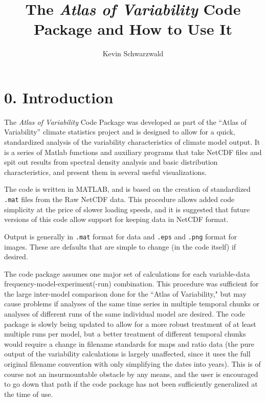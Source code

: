 \documentclass{article}
\title{The \textit{Atlas of Variability} Code Package and How to Use It}
\author{Kevin Schwarzwald}
\begin{document}
\maketitle

\tableofcontents

\section*{0. Introduction}
The \textit{Atlas of Variability} Code Package was developed as part of the ``Atlas of Variability'' climate statistics project and is designed to allow for a quick, standardized analysis of the variability characteristics of climate model output. It is a series of Matlab functions and auxiliary programs that take NetCDF files and spit out results from spectral density analysis and basic distribution characteristics, and present them in several useful visualizations. 

The code is written in MATLAB, and is based on the creation of standardized \texttt{.mat} files from the Raw NetCDF data. This procedure allows added code simplicity at the price of slower loading speeds, and it is suggested that future versions of this code allow support for keeping data in NetCDF format. 

Output is generally in \texttt{.mat} format for data and \texttt{.eps} and \texttt{.png} format for images. These are defaults that are simple to change (in the code itself) if desired.

The code package assumes one major set of calculations for each variable-data frequency-model-experiment(-run) combination. This procedure was sufficient for the large inter-model comparison done for the ``Atlas of Variability," but may cause problems if analyses of the same time series in multiple temporal chunks or analyses of different runs of the same individual model are desired. The code package is slowly being updated to allow for a more robust treatment of at least multiple runs per model, but a better treatment of different temporal chunks would require a change in filename standards for maps and ratio data (the pure output of the variability calculations is largely unaffected, since it uses the full original filename convention with only simplifying the dates into years). This is of course not an insurmountable obstacle by any means, and the user is encouraged to go down that path if the code package has not been sufficiently generalized at the time of use. 
\end{document}
